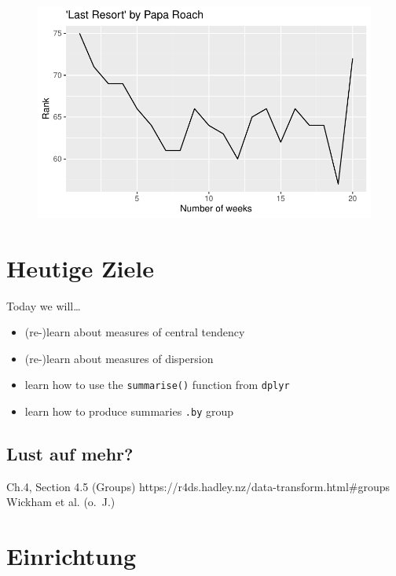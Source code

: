 \documentclass[
  letterpaper,
  DIV=11]{scrartcl}
\providecommand{\tightlist}{%
  \setlength{\itemsep}{0pt}\setlength{\parskip}{0pt}}\usepackage{longtable,booktabs,array}
\begin{document}
\begin{figure}[H]

{\centering \includegraphics{_descr_stats_EN_files/figure-pdf/unnamed-chunk-16-1.pdf}

}

\end{figure}

\hypertarget{heutige-ziele}{%
\section*{Heutige Ziele}\label{heutige-ziele}}

Today we will\ldots{}

\begin{itemize}
\tightlist
\item
  (re-)learn about measures of central tendency
\item
  (re-)learn about measures of dispersion
\item
  learn how to use the \texttt{summarise()} function from \texttt{dplyr}
\item
  learn how to produce summaries \texttt{.by} group
\end{itemize}

\hypertarget{lust-auf-mehr}{%
\subsection*{Lust auf mehr?}\label{lust-auf-mehr}}

Ch.4, Section 4.5 (Groups)
https://r4ds.hadley.nz/data-transform.html\#groups Wickham et al.
(o.~J.)

\hypertarget{einrichtung}{%
\section{Einrichtung}\label{einrichtung}}
\end{document}
